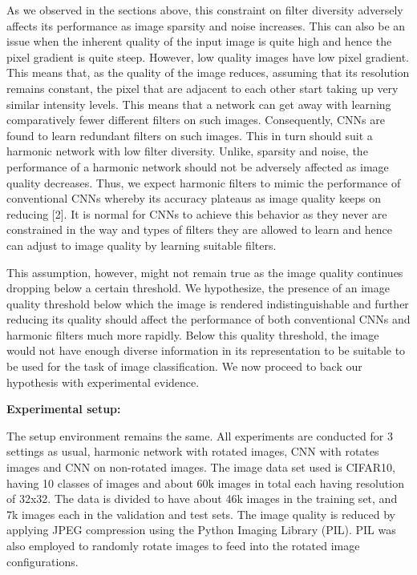 \documentclass{article}
\begin{document}
As we observed in the sections above, this constraint on filter diversity adversely affects its performance as image sparsity and noise increases. This can also be an issue when the inherent quality of the input image is quite high and hence the pixel gradient is quite steep. However, low quality images have low pixel gradient. This means that, as the quality of the image reduces, assuming that its resolution remains constant, the pixel that are adjacent to each other start taking up very similar intensity levels. This means that a network can get away with learning comparatively fewer different filters on such images. Consequently, CNNs are found to learn redundant filters on such images. This in turn should suit a harmonic network with low filter diversity. Unlike, sparsity and noise, the performance of a harmonic network should not be adversely affected as image quality decreases. Thus, we expect harmonic filters to mimic the performance of conventional CNNs whereby its accuracy plateaus as image quality keeps on reducing [2]. It is normal for CNNs to achieve this behavior as they never are constrained in the way and types of filters they are allowed to learn and hence can adjust to image quality by learning suitable filters.

This assumption, however, might not remain true as the image quality continues dropping below a certain threshold. We hypothesize, the presence of an image quality threshold below which the image is rendered indistinguishable and further reducing its quality should affect the performance of both conventional CNNs and harmonic filters much more rapidly. Below this quality threshold, the image would not have enough diverse information in its representation to be suitable to be used for the task of image classification. We now proceed to back our hypothesis with experimental evidence.

\textbf{Experimental setup:}
 
The setup environment remains the same. All experiments are conducted for 3 settings as usual, harmonic network with rotated images, CNN with rotates images and CNN on non-rotated images. The image data set used is CIFAR10, having 10 classes of images and about 60k images in total each having resolution of 32x32. The data is divided to have about 46k images in the training set, and 7k images each in the validation and test sets. The image quality is reduced by applying JPEG compression using the Python Imaging Library (PIL). PIL was also employed to randomly rotate images to feed into the rotated image configurations.
\end{document}
